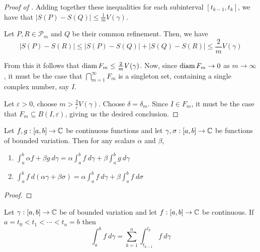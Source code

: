 \begin{proof}[Proof of ]
    Adding together these inequalities for each subinterval $[t_{k - 1}, t_k]$, we have that $|S(P) - S(Q)|\le\frac{1}{m}V(\gamma)$.

    Let $P,R\in\mathscr P_m$ and $Q$ be their common refinement. Then, we have 
    \begin{equation*}
        |S(P) - S(R)|\le|S(P) - S(Q)| + |S(Q) - S(R)|\le\frac{2}{m}V(\gamma)
    \end{equation*}

    From this it follows that $\operatorname{diam} F_m\le\frac{2}{m}V(\gamma)$. Now, since $\operatorname{diam} F_m\to 0$ as $m\to\infty$, it must be the case that $\bigcap\limits_{m = 1}^\infty F_m$ is a singleton set, containing a single complex number, say $I$.

    Let $\varepsilon > 0$, choose $m > \frac{2}{\varepsilon}V(\gamma)$. Choose $\delta = \delta_m$. Since $I\in F_m$, it must be the case that $F_m\subseteq B(I,\varepsilon)$, giving us the desired conclusion.
\end{proof}

\begin{proposition}
    Let $f,g: [a,b]\to\mathbb{C}$ be continuous functions and let $\gamma,\sigma: [a,b]\to\mathbb{C}$ be functions of bounded variation. Then for any scalars $\alpha$ and $\beta$, 
    \begin{enumerate}
        \item $\int_a^b \alpha f + \beta g~d\gamma = \alpha\int_a^b f~d\gamma + \beta\int_a^b g~d\gamma$
        \item $\int_a^b f~d(\alpha\gamma + \beta\sigma) = \alpha\int_a^bf~d\gamma + \beta\int_a^b f~d\sigma$
    \end{enumerate}
\end{proposition}
\begin{proof}
    
\end{proof}

\begin{lemma}
    Let $\gamma: [a,b]\to\mathbb{C}$ be of bounded variation and let $f: [a,b]\to\mathbb{C}$ be continuous. If $a = t_0 < t_1 < \cdots < t_n = b$ then 
    \begin{equation*}
        \int_a^b f~d\gamma = \sum_{k = 1}^n\int_{t_{k - 1}}^{t_k}f~d\gamma
    \end{equation*}
\end{lemma}

